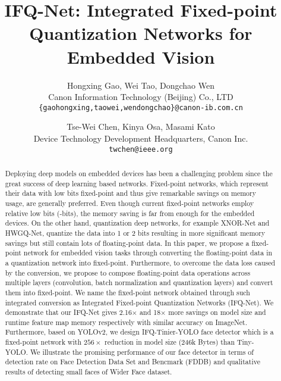 \documentclass[10pt,twocolumn,letterpaper]{article}
\begin{document}
\title{IFQ-Net: Integrated Fixed-point Quantization Networks for Embedded Vision}


\author{Hongxing Gao, Wei Tao, Dongchao Wen\\
Canon Information Technology (Beijing) Co., LTD\\
{\tt\small \{gaohongxing,taowei,wendongchao\}@canon-ib.com.cn}
\and
Tse-Wei Chen, Kinya Osa, Masami Kato\\
Device Technology Development Headquarters, Canon Inc.\\
{\tt\small twchen@ieee.org}
}

\maketitle
\thispagestyle{empty}


\begin{abstract}
Deploying deep models on embedded devices has been a challenging problem since the great success of deep learning based networks. Fixed-point networks, which represent their data with low bits fixed-point and thus give remarkable savings on memory usage, are generally preferred. Even though current fixed-point networks employ relative low bits (-bits), the memory saving is far from enough for the embedded devices. On the other hand, quantization deep networks, for example XNOR-Net and HWGQ-Net, quantize the data into 1 or 2 bits resulting in more significant memory savings but still contain lots of floating-point data. In this paper, we propose a fixed-point network for embedded vision tasks through converting the floating-point data in a quantization network into fixed-point.  Furthermore, to overcome the data loss caused by the conversion, we propose to compose floating-point data operations across multiple layers (\eg convolution, batch normalization and quantization layers) and convert them into fixed-point. We name the fixed-point network obtained through such integrated conversion as Integrated Fixed-point Quantization Networks (IFQ-Net). We demonstrate that our IFQ-Net gives 2.16$\times$  and 18$\times$  more savings on model size and runtime feature map memory respectively with similar accuracy on ImageNet. Furthermore, based on YOLOv2, we design IFQ-Tinier-YOLO face detector which is a fixed-point network with $256\times$ reduction in model size (246k Bytes) than Tiny-YOLO. We illustrate the promising performance of our face detector in terms of detection rate on Face Detection Data Set and Bencmark (FDDB) and qualitative results of detecting small faces of Wider Face dataset.





\end{abstract}
\end{document}
